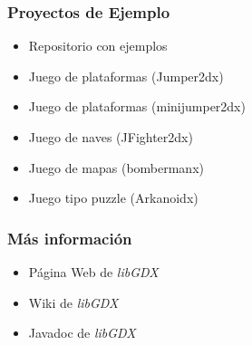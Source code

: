 \documentclass[xcolor={dvipsnames}]{beamer}
\begin{document}
\begin{frame}\frametitle{Proyectos de Ejemplo}
    \begin{itemize}
        \item Repositorio con ejemplos \href{https://github.com/codeandcoke/libgdx}{}
        \item Juego de plataformas (Jumper2dx) \href{https://github.com/codeandcoke/jumper2dx}{}
        \item Juego de plataformas (minijumper2dx) \href{https://github.com/codeandcoke/minijumper2dx}{}
        \item Juego de naves (JFighter2dx) \href{https://github.com/codeandcoke/jfighter2dx}{}
        \item Juego de mapas (bombermanx) \href{https://github.com/codeandcoke/jbombermanx}{}
        \item Juego tipo puzzle (Arkanoidx) \href{https://github.com/codeandcoke/arkanoidx}{}
    \end{itemize}
\end{frame}

\begin{frame}\frametitle{Más información}
    \begin{itemize}
        \item Página Web de \emph{\textcolor{resalta}{libGDX}} \href{https://libgdx.badlogicgames.com}{}
        \item Wiki de \emph{\textcolor{resalta}{libGDX}} \href{https://github.com/libgdx/libgdx/wiki}{}
        \item Javadoc de \emph{\textcolor{resalta}{libGDX}} \href{https://libgdx.badlogicgames.com/nightlies/docs/api}{}
    \end{itemize}
\end{frame}
\end{document}
